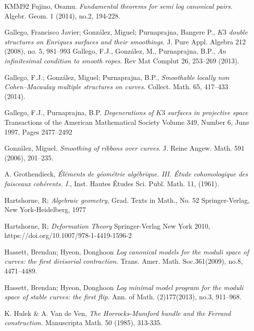 \documentclass[11pt,twoside]{amsart}
\theoremstyle{plain}
\numberwithin{equation}{section}
\theoremstyle{definition}
\begin{document}
\begin{thebibliography}{KMM92}
 Fujino, Osamu.
\emph{Fundamental theorems for semi log canonical pairs.} Algebr. Geom. 1 (2014), no.2, 194-228.

\color{black}

Gallego, Francisco Javier; González, Miguel; Purnaprajna, Bangere P., 
\emph{$K3$ double structures on Enriques surfaces and their smoothings.}
J. Pure Appl. Algebra 212 (2008), no. 5, 981--993
Gallego, F.J., González, M., Purnaprajna, B.P., 
\emph{An infinitesimal condition to smooth ropes.}
Rev Mat Complut 26, 253–269 (2013).

Gallego, F.J.; González, Miguel; Purnaprajna, B.P., 
\emph{Smoothable locally non Cohen–Macaulay multiple structures on curves.} 
Collect. Math. 65, 417–433 (2014).

Gallego, F.J., Purnaprajna, B.P.
\emph{Degenerations of $K3$ surfaces in projective space}
Transactions of the American Mathematical Society
Volume 349, Number 6, June 1997, Pages 2477–2492

  Gonz\'alez, Miguel.
  \emph{Smoothing of ribbons over curves}.
  J. Reine Angew. Math. 591 (2006), 201--235.

  \color{black}

   A. Grothendieck, \emph{\'El\'ements 
de g\'eom\'etrie 
alg\'ebrique. III. \'Etude cohomologique des faisceaux 
coh\'erents. I.}, Inst. 
Hautes \'Etudes Sci. Publ. Math.  
{11}, (1961).

Hartshorne, R; \emph{Algebraic geometry}, 
Grad. Texts in Math., No. 52
Springer-Verlag, New York-Heidelberg, 1977

\color{black}
  
Hartshorne, R;
\emph{Deformation Theory}
Springer-Verlag New York 2010, https://doi.org/10.1007/978-1-4419-1596-2

Hassett, Brendan; Hyeon, Donghoon
\emph{Log canonical models for the moduli space of curves: the first divisorial contraction.}
Trans. Amer. Math. Soc.361(2009), no.8, 4471–4489.

Hassett, Brendan; Hyeon, Donghoon
\emph{Log minimal model program for the moduli space of stable curves: the first flip.}
Ann. of Math. (2)177(2013), no.3, 911–968.

 K. Hulek \& A. Van de Ven, 
\emph{The Horrocks-Mumford bundle and the Ferrand construction.}
Manuscripta Math. 50 (1985), 313-335.


\end{thebibliography}
\end{document}
